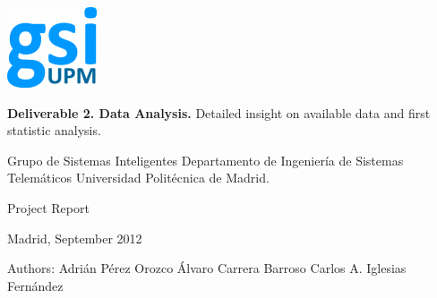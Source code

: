 \begin{titlepage}
\sffamily
\begin{flushright}

\rightskip=-1cm

\includegraphics[scale=1]{./img/logoGSI.png} 

\bigskip
\bigskip
\bigskip



\LARGE{\textbf{Deliverable 2. Data Analysis.}}
\linebreak
\large{Detailed insight on available data and first statistic analysis.}

\bigskip

\LARGE{Grupo de Sistemas Inteligentes}
\linebreak
\large{Departamento de Ingeniería de Sistemas Telemáticos}
\linebreak
\large{Universidad Politécnica de Madrid.}

\bigskip
\bigskip
\bigskip
\bigskip
\bigskip
\bigskip

\large{Project Report}

\bigskip

\normalsize{Madrid, September 2012}

\bigskip
\bigskip
\bigskip
\bigskip
\bigskip
\bigskip
\bigskip
\bigskip
\bigskip
\bigskip
\bigskip
\bigskip
\bigskip
\bigskip
\bigskip
\bigskip

\normalsize{Authors:}
\linebreak
\large{Adrián Pérez Orozco}
\linebreak
\large{Álvaro Carrera Barroso}
\linebreak
\large{Carlos A. Iglesias Fernández}

\end{flushright}
\end{titlepage}
